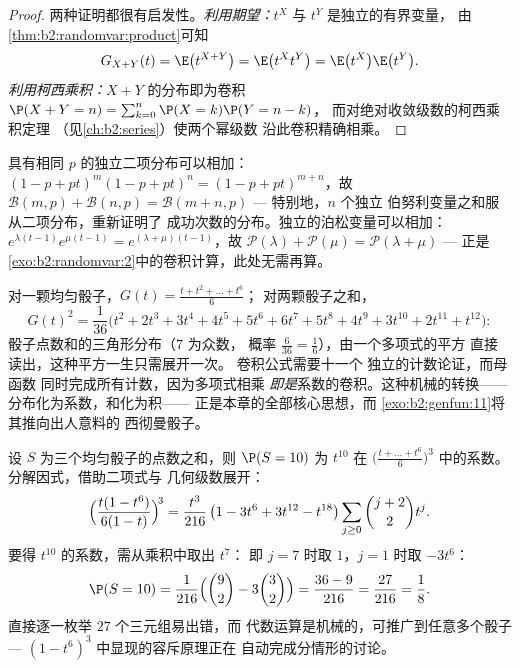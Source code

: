 \begin{proof}
两种证明都很有启发性。\emph{利用期望：}$t^X$ 与
$t^Y$ 是独立的有界变量，
由\cref{thm:b2:randomvar:product}可知
\[
G_{X+Y}(t) = \E\bigl(t^{X+Y}\bigr)
= \E\bigl(t^X t^Y\bigr)
= \E\bigl(t^X\bigr)\E\bigl(t^Y\bigr) .
\]
\emph{利用柯西乘积：}$X + Y$ 的分布即为卷积
$\P(X + Y = n) = \sum_{k=0}^n \P(X = k)\P(Y = n - k)$，
而对绝对收敛级数的柯西乘积定理
（见\cref{ch:b2:series}）使两个幂级数
沿此卷积精确相乘。
\end{proof}

\begin{example}[经典分布的稳定性]\label{ex:b2:genfun:stability}
具有相同 $p$ 的独立二项分布可以相加：$(1 - p + pt)^m(1 -
p + pt)^n = (1 - p + pt)^{m+n}$，故 $\mathcal{B}(m, p) +
\mathcal{B}(n, p) = \mathcal{B}(m + n, p)$ --- 特别地，$n$ 个独立
伯努利变量之和服从二项分布，重新证明了
成功次数的分布。独立的泊松变量可以相加：
$e^{\lambda(t-1)}e^{\mu(t-1)} = e^{(\lambda + \mu)(t-1)}$，故
$\mathcal{P}(\lambda) + \mathcal{P}(\mu) = \mathcal{P}(\lambda +
\mu)$ --- 正是
\cref{exo:b2:randomvar:2}中的卷积计算，此处无需再算。
\end{example}

\begin{example}\label{ex:b2:genfun:twodice}
对一颗均匀骰子，$G(t) = \frac{t + t^2 + \dots + t^6}{6}$；
对两颗骰子之和，
\[
G(t)^2 = \frac{1}{36}\bigl(t^2 + 2t^3 + 3t^4 + 4t^5 + 5t^6 +
6t^7 + 5t^8 + 4t^9 + 3t^{10} + 2t^{11} + t^{12}\bigr) :
\]
骰子点数和的三角形分布（$7$ 为众数，
概率 $\frac6{36} = \frac16$），由一个多项式的平方
直接读出，这种平方一生只需展开一次。
卷积公式需要十一个
独立的计数论证，而母函数
同时完成所有计数，因为多项式相乘
\emph{即是}系数的卷积。这种机械的转换——
分布化为系数，和化为积——
正是本章的全部核心思想，而
\cref{exo:b2:genfun:11}将其推向出人意料的
西彻曼骰子。
\end{example}

\begin{example}\label{ex:b2:genfun:threedice}
设 $S$ 为三个均匀骰子的点数之和，则 $\P(S = 10)$ 为
$t^{10}$ 在 $\bigl(\frac{t + \dots +
t^6}6\bigr)^3$ 中的系数。分解因式，借助二项式与
几何级数展开：
\[
\Bigl(\frac{t(1 - t^6)}{6(1 - t)}\Bigr)^{\!3}
= \frac{t^3}{216}\,\bigl(1 - 3t^6 + 3t^{12} -
t^{18}\bigr)\sum_{j\geq0}\binom{j+2}2t^j .
\]
要得 $t^{10}$ 的系数，需从乘积中取出 $t^7$：
即 $j = 7$ 时取 $1$，$j = 1$ 时取
$-3t^6$：
\[
\P(S = 10) = \frac{1}{216}\Bigl(\binom92 -
3\binom32\Bigr) = \frac{36 - 9}{216} = \frac{27}{216} =
\frac18 .
\]
直接逐一枚举 $27$ 个三元组易出错，而
代数运算是机械的，可推广到任意多个骰子 ---
$(1 - t^6)^3$ 中显现的容斥原理正在
自动完成分情形的讨论。
\end{example}

